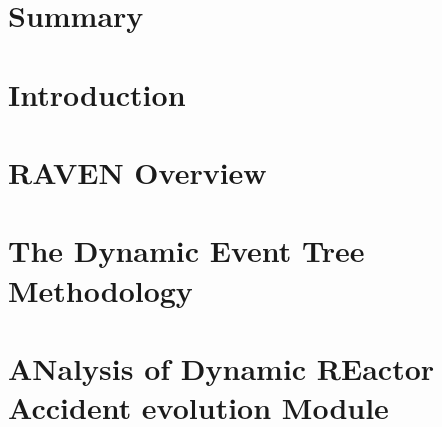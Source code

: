\documentclass[pdf,ps2pdf,12pt]{INLreport}
\begin{document}
    \clearpage
    \section*{Summary}
    




    \SANDmain		%

    \section{Introduction}
    
    
    \section{RAVEN Overview}
    

    \section{The Dynamic Event Tree Methodology}
   

    \section{ANalysis of Dynamic REactor Accident evolution Module}
   
\end{document}
